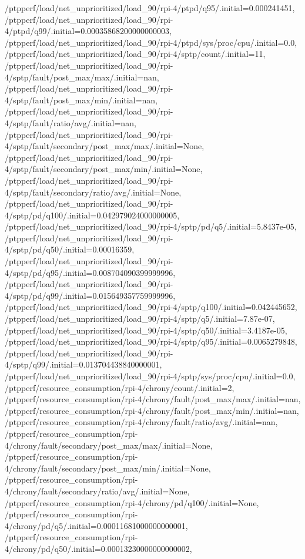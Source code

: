 {    /ptpperf/load/net_unprioritized/load_90/rpi-4/ptpd/q95/.initial=0.000241451,
    /ptpperf/load/net_unprioritized/load_90/rpi-4/ptpd/q99/.initial=0.00035868200000000003,
    /ptpperf/load/net_unprioritized/load_90/rpi-4/ptpd/sys/proc/cpu/.initial=0.0,
    /ptpperf/load/net_unprioritized/load_90/rpi-4/sptp/count/.initial=11,
    /ptpperf/load/net_unprioritized/load_90/rpi-4/sptp/fault/post_max/max/.initial=nan,
    /ptpperf/load/net_unprioritized/load_90/rpi-4/sptp/fault/post_max/min/.initial=nan,
    /ptpperf/load/net_unprioritized/load_90/rpi-4/sptp/fault/ratio/avg/.initial=nan,
    /ptpperf/load/net_unprioritized/load_90/rpi-4/sptp/fault/secondary/post_max/max/.initial=None,
    /ptpperf/load/net_unprioritized/load_90/rpi-4/sptp/fault/secondary/post_max/min/.initial=None,
    /ptpperf/load/net_unprioritized/load_90/rpi-4/sptp/fault/secondary/ratio/avg/.initial=None,
    /ptpperf/load/net_unprioritized/load_90/rpi-4/sptp/pd/q100/.initial=0.042979024000000005,
    /ptpperf/load/net_unprioritized/load_90/rpi-4/sptp/pd/q5/.initial=5.8437e-05,
    /ptpperf/load/net_unprioritized/load_90/rpi-4/sptp/pd/q50/.initial=0.00016359,
    /ptpperf/load/net_unprioritized/load_90/rpi-4/sptp/pd/q95/.initial=0.008704090399999996,
    /ptpperf/load/net_unprioritized/load_90/rpi-4/sptp/pd/q99/.initial=0.015649357759999996,
    /ptpperf/load/net_unprioritized/load_90/rpi-4/sptp/q100/.initial=0.042445652,
    /ptpperf/load/net_unprioritized/load_90/rpi-4/sptp/q5/.initial=7.87e-07,
    /ptpperf/load/net_unprioritized/load_90/rpi-4/sptp/q50/.initial=3.4187e-05,
    /ptpperf/load/net_unprioritized/load_90/rpi-4/sptp/q95/.initial=0.0065279848,
    /ptpperf/load/net_unprioritized/load_90/rpi-4/sptp/q99/.initial=0.013704438840000001,
    /ptpperf/load/net_unprioritized/load_90/rpi-4/sptp/sys/proc/cpu/.initial=0.0,
    /ptpperf/resource_consumption/rpi-4/chrony/count/.initial=2,
    /ptpperf/resource_consumption/rpi-4/chrony/fault/post_max/max/.initial=nan,
    /ptpperf/resource_consumption/rpi-4/chrony/fault/post_max/min/.initial=nan,
    /ptpperf/resource_consumption/rpi-4/chrony/fault/ratio/avg/.initial=nan,
    /ptpperf/resource_consumption/rpi-4/chrony/fault/secondary/post_max/max/.initial=None,
    /ptpperf/resource_consumption/rpi-4/chrony/fault/secondary/post_max/min/.initial=None,
    /ptpperf/resource_consumption/rpi-4/chrony/fault/secondary/ratio/avg/.initial=None,
    /ptpperf/resource_consumption/rpi-4/chrony/pd/q100/.initial=None,
    /ptpperf/resource_consumption/rpi-4/chrony/pd/q5/.initial=0.00011681000000000001,
    /ptpperf/resource_consumption/rpi-4/chrony/pd/q50/.initial=0.00013230000000000002,
}
